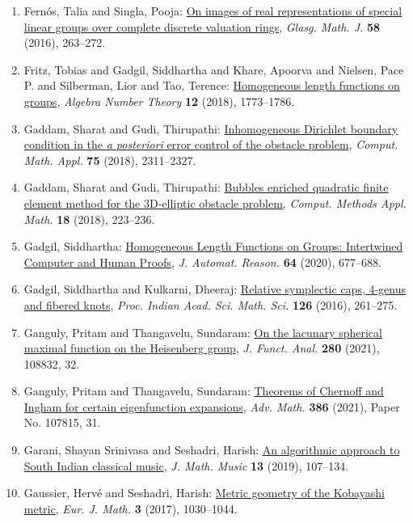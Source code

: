 \begin{enumerate}
\item Fern\'{o}s, Talia and Singla, Pooja: \href{https://doi.org/10.1017/S001708951500018X}{On images of real representations of special linear groups
over complete discrete valuation rings}, \emph{Glasg. Math. J.} {\bf 58} (2016), 263--272.
\item Fritz, Tobias and Gadgil, Siddhartha and Khare, Apoorva and Nielsen, Pace P. and Silberman, Lior and Tao, Terence: \href{https://doi.org/10.2140/ant.2018.12.1773}{Homogeneous length functions on groups}, \emph{Algebra Number Theory} {\bf 12} (2018), 1773--1786.
\item Gaddam, Sharat and Gudi, Thirupathi: \href{https://doi.org/10.1016/j.camwa.2017.12.010}{Inhomogeneous {D}irichlet boundary condition in the {\it a
posteriori} error control of the obstacle problem}, \emph{Comput. Math. Appl.} {\bf 75} (2018), 2311--2327.
\item Gaddam, Sharat and Gudi, Thirupathi: \href{https://doi.org/10.1515/cmam-2017-0018}{Bubbles enriched quadratic finite element method for the
3{D}-elliptic obstacle problem}, \emph{Comput. Methods Appl. Math.} {\bf 18} (2018), 223--236.
\item Gadgil, Siddhartha: \href{https://doi.org/10.1007/s10817-019-09523-1}{Homogeneous {L}ength {F}unctions on {G}roups: {I}ntertwined
{C}omputer and {H}uman {P}roofs}, \emph{J. Automat. Reason.} {\bf 64} (2020), 677--688.
\item Gadgil, Siddhartha and Kulkarni, Dheeraj: \href{https://doi.org/10.1007/s12044-016-0278-3}{Relative symplectic caps, 4-genus and fibered knots}, \emph{Proc. Indian Acad. Sci. Math. Sci.} {\bf 126} (2016), 261--275.
\item Ganguly, Pritam and Thangavelu, Sundaram: \href{https://doi.org/10.1016/j.jfa.2020.108832}{On the lacunary spherical maximal function on the {H}eisenberg
group}, \emph{J. Funct. Anal.} {\bf 280} (2021), 108832, 32.
\item Ganguly, Pritam and Thangavelu, Sundaram: \href{https://doi.org/10.1016/j.aim.2021.107815}{Theorems of {C}hernoff and {I}ngham for certain eigenfunction
expansions}, \emph{Adv. Math.} {\bf 386} (2021), Paper No. 107815, 31.
\item Garani, Shayan Srinivasa and Seshadri, Harish: \href{https://doi.org/10.1080/17459737.2019.1604845}{An algorithmic approach to {S}outh {I}ndian classical music}, \emph{J. Math. Music} {\bf 13} (2019), 107--134.
\item Gaussier, Herv\'{e} and Seshadri, Harish: \href{https://doi.org/10.1007/s40879-017-0177-x}{Metric geometry of the {K}obayashi metric}, \emph{Eur. J. Math.} {\bf 3} (2017), 1030--1044.

\end{enumerate}
